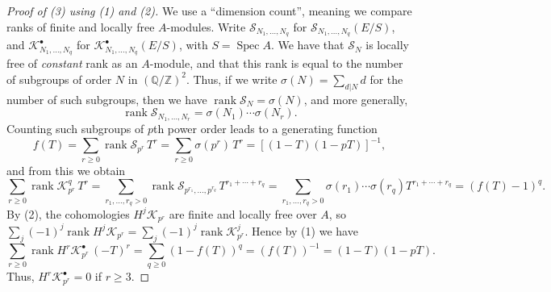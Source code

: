 \documentclass[11pt]{amsart}
\numberwithin{equation}{section}
\theoremstyle{plain}
\theoremstyle{remark}
\theoremstyle{plain}
\begin{document}
\begin{proof}[Proof of (3) using (1) and (2)]
We use a ``dimension count'', meaning we compare ranks of finite and
locally free $A$-modules.  Write ${\mathscr{S}}_{N_1,\dots,N_q}$ for
${\mathscr{S}}_{N_1,\dots,N_q}(E/S)$, and ${\mathscr{K}}_{N_1,\dots,N_q}^\bullet$ for
${\mathscr{K}}_{N_1,\dots,N_q}^\bullet(E/S)$, with $S={\operatorname{Spec}} A$.  
We have that ${\mathscr{S}}_N$ is locally
free of \emph{constant} rank as an $A$-module, and that this rank is
equal to the number of subgroups of order $N$ in $({\mathbb{Q}}/{\mathbb{Z}})^2$.  Thus,
if we write $\sigma(N)=\sum_{d|N} d$ for the number of such subgroups,
then we have ${\operatorname{rank}}{\mathscr{S}}_N =\sigma(N)$, and more generally, 
\[
{\operatorname{rank}}{\mathscr{S}}_{N_1,\dots,N_r} = \sigma(N_1)\cdots \sigma(N_r).
\]
Counting such subgroups of $p$th power order leads to a
generating function
\[
f(T) = \sum_{r\geq0} {\operatorname{rank}}{\mathscr{S}}_{p^r}\,T^r = \sum_{r\geq0}
\sigma(p^r)\, T^r= 
[(1-T)(1-pT)]^{-1},
\]
and from this we obtain
\[
\sum_{r\geq0} {\operatorname{rank}}{\mathscr{K}}^q_{p^r}\,T^r = \sum_{r_1,\dots,r_q>0}
{\operatorname{rank}} {\mathscr{S}}_{p^{r_1},\dots,p^{r_q}}\,T^{r_1+\cdots+r_q} =
\sum_{r_1,\dots,r_q>0} \sigma(r_1)\cdots
\sigma(r_q)T^{r_1+\cdots+r_q} = (f(T)-1)^q.
\]
By (2), the cohomologies $H^j{\mathscr{K}}_{p^r}$ are finite and locally free
over $A$, so $\sum_j (-1)^j{\operatorname{rank}} H^j{\mathscr{K}}_{p^r}= \sum_j(-1)^j{\operatorname{rank}}
{\mathscr{K}}_{p^r}^j$.   
Hence by (1) we have
\[
\sum_{r\geq0}{\operatorname{rank}} H^r{\mathscr{K}}_{p^r}^\bullet\, (-T)^r = \sum_{q\geq0}
(1-f(T))^q = (f(T))^{-1} =(1-T)(1-pT).
\]
Thus, $H^r{\mathscr{K}}^\bullet_{p^r}=0$ if $r\geq 3$.
\end{proof}
\end{document}
